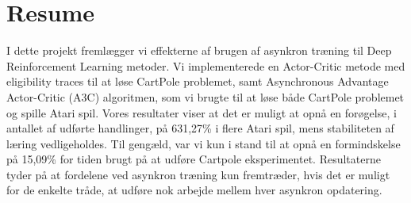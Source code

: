 \documentclass[11pt]{article}
\begin{document}
\section*{Resume}


I dette projekt fremlægger vi effekterne af brugen af asynkron træning
til Deep Reinforcement Learning metoder.
Vi implementerede en Actor-Critic metode med eligibility traces til at løse
CartPole problemet, samt
Asynchronous Advantage Actor-Critic (A3C) algoritmen, som vi brugte
til at løse både CartPole problemet og spille Atari spil.
Vores resultater viser at det er muligt at opnå en forøgelse, i
antallet af udførte handlinger, på 631,27\% i flere Atari spil,
mens stabiliteten af læring vedligeholdes.
Til gengæld, var vi kun i stand til at opnå en formindskelse på 15,09\% for tiden
brugt på at udføre Cartpole eksperimentet.
Resultaterne tyder på at fordelene ved asynkron træning kun fremtræder,
hvis det er muligt for de enkelte tråde, at udføre nok arbejde mellem hver asynkron opdatering.
\end{document}
